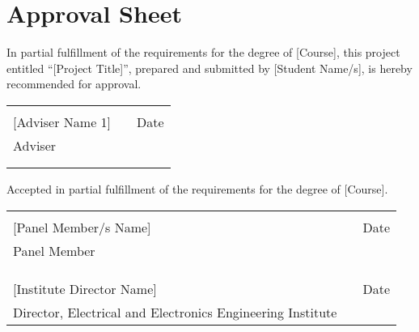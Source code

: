 \chapter*{Approval Sheet}
\thispagestyle{empty}
In partial fulfillment of the requirements for the degree of [Course], this project
entitled ``[Project Title]'', prepared and submitted by [Student Name/s], is hereby recommended for approval.

\vspace*{1cm}

\begin{tabular}{llc}
 &  & \tabularnewline
\cline{1-1} \cline{3-3} 
[Adviser Name 1] &  & Date\tabularnewline
Adviser &  & \tabularnewline
 &  & \tabularnewline
 
 
 
\hspace*{10cm} & \hspace*{1cm} & \hspace*{2cm}\tabularnewline
\end{tabular}

\vspace*{1cm}

\noindent Accepted in partial fulfillment of the requirements for
the degree of [Course].

\vspace*{1cm}
\begin{tabular}{llc}
 &  & \tabularnewline
\cline{1-1} \cline{3-3} 
[Panel Member/s Name] &  & Date\tabularnewline
Panel Member &  & \tabularnewline
 &  & \tabularnewline
\hspace*{10cm} & \hspace*{1cm} & \hspace*{2cm}\tabularnewline
 &  & \tabularnewline
\cline{1-1} \cline{3-3} 
[Institute Director Name] &  & Date\tabularnewline
Director, Electrical and Electronics Engineering Institute &  & \tabularnewline
\end{tabular}
